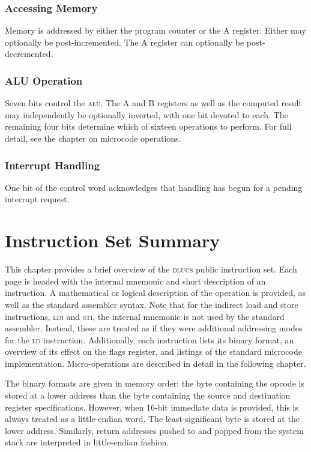\documentclass[11pt]{book}
\begin{document}
\subsection{Accessing Memory}
Memory is addressed by either the program counter or the A register.
Either may optionally be post-incremented.
The A register can optionally be post-decremented.

\subsection{ALU Operation}
Seven bits control the \textsc{alu}.
The A and B registers as well as the computed result
may independently be optionally inverted,
with one bit devoted to each.
The remaining four bits determine
which of sixteen operations to perform.
For full detail, see the chapter on microcode operations.

\subsection{Interrupt Handling}
One bit of the control word acknowledges
that handling has begun for a pending interrupt request.


\chapter{Instruction Set Summary}
This chapter provides a brief overview
of the \textsc{dlucs} public instruction set.
Each page is headed with the internal mnemonic and short description
of an instruction.
A mathematical or logical description of the operation is provided,
as well as the standard assembler syntax.
Note that for the indirect load and store instructions,
\textsc{ldi} and \textsc{sti},
the internal mnemonic is not used by the standard assembler.
Instead, these are treated as if they were additional addressing modes
for the \textsc{ld} instruction.
Additionally, each instruction lists its binary format,
an overview of its effect on the flags register,
and listings of the standard microcode implementation.
Micro-operations are described in detail in the following chapter.

The binary formats are given in memory order:
the byte containing the opcode is stored at a lower address
than the byte containing the source
and destination register specifications.
However, when 16-bit immediate data is provided,
this is always treated as a little-endian word.
The least-significant byte is stored at the lower address.
Similarly, return addresses pushed to and popped from the system stack
are interpreted in little-endian fashion.
\end{document}
